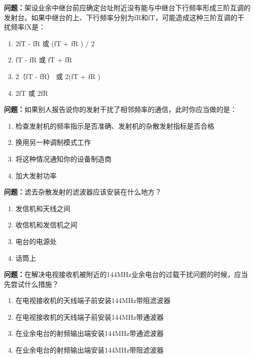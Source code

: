 \bigskip


\noindent\textbf{问题：}架设业余中继台前应确定台址附近没有能与中继台下行频率形成三阶互调的发射台。如果中继台的上、下行频率分别为fR和fT，可能造成这种三阶互调的干扰频率fX是：
\begin{enumerate}[label=\Alph*), leftmargin=3em]
\item 2fT - fR 或 (fT + fR ) / 2
\item fT - fR 或 fT + fR
\item 2（fT - fR） 或 2(fT + fR )
\item 2fT 或 2fR
\end{enumerate}

\bigskip


\noindent\textbf{问题：}如果别人报告说你的发射干扰了相邻频率的通信，此时你应当做的是：
\begin{enumerate}[label=\Alph*), leftmargin=3em]
\item 检查发射机的频率指示是否准确、发射机的杂散发射指标是否合格
\item 换用另一种调制模式工作
\item 将这种情况通知你的设备制造商
\item 加大发射功率
\end{enumerate}

\bigskip


\noindent\textbf{问题：}滤去杂散发射的滤波器应该安装在什么地方？
\begin{enumerate}[label=\Alph*), leftmargin=3em]
\item 发信机和天线之间
\item 收信机和发信机之间
\item 电台的电源处
\item 话筒上
\end{enumerate}

\bigskip


\noindent\textbf{问题：}在解决电视接收机被附近的144MHz业余电台的过载干扰问题的时候，应当先尝试什么措施？
\begin{enumerate}[label=\Alph*), leftmargin=3em]
\item 在电视接收机的天线端子前安装144MHz带阻滤波器
\item 在电视接收机的天线端子前安装144MHz带通波器
\item 在业余电台的射频输出端安装144MHz带通滤波器
\item 在业余电台的射频输出端安装144MHz带阻滤波器
\end{enumerate}

\bigskip


